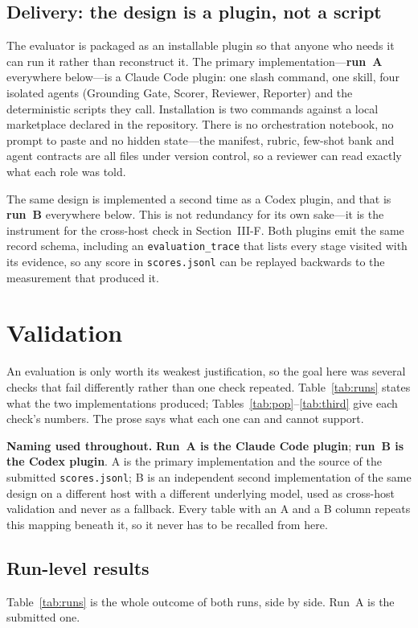 \documentclass[conference]{IEEEtran}
\begin{document}
\subsection{Delivery: the design is a plugin, not a script}
The evaluator is packaged as an installable plugin so that anyone who
needs it can run it rather than reconstruct it. The primary
implementation---\textbf{run~A} everywhere below---is a Claude Code
plugin: one slash command, one skill,
four isolated agents (Grounding Gate, Scorer, Reviewer, Reporter) and
the deterministic scripts they call. Installation is two commands
against a local marketplace declared in the repository. There is no
orchestration notebook, no prompt to paste and no hidden state---the
manifest, rubric, few-shot bank and agent contracts are all files under
version control, so a reviewer can read exactly what each role was
told.

The same design is implemented a second time as a Codex plugin, and that
is \textbf{run~B} everywhere below. This is
not redundancy for its own sake---it is the instrument for the
cross-host check in Section~III-F. Both plugins emit the same record
schema, including an \texttt{evaluation\_trace} that lists every stage
visited with its evidence, so any score in \texttt{scores.jsonl} can be
replayed backwards to the measurement that produced it.

\section{Validation}

An evaluation is only worth its weakest justification, so the goal here
was several checks that fail differently rather than one check repeated.
Table~\ref{tab:runs} states what the two implementations produced;
Tables~\ref{tab:pop}--\ref{tab:third} give each check's numbers. The
prose says what each one can and cannot support.

\textbf{Naming used throughout.} \textbf{Run~A is the Claude Code
plugin}; \textbf{run~B is the Codex plugin}. A is the primary
implementation and the source of the submitted \texttt{scores.jsonl}; B
is an independent second implementation of the same design on a
different host with a different underlying model, used as cross-host
validation and never as a fallback. Every table with an A and a B column
repeats this mapping beneath it, so it never has to be recalled from
here.

\subsection{Run-level results}
Table~\ref{tab:runs} is the whole outcome of both runs, side by side.
Run~A is the submitted one.
\end{document}
